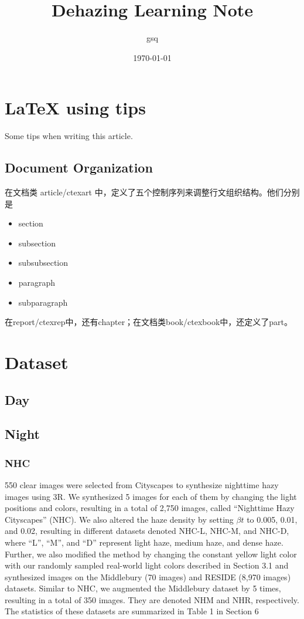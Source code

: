 \documentclass[UTF8]{ctexart}
\title{Dehazing Learning Note}
\author{gsq}
\date{\today}
\begin{document}
\maketitle
\tableofcontents

\section{LaTeX using tips}

Some tips when writing this article.

\subsection{Document Organization}
在文档类 article/ctexart 中，定义了五个控制序列来调整行文组织结构。他们分别是

\begin{itemize}
    \item section
    \item subsection
    \item subsubsection
    \item paragraph
    \item subparagraph
\end{itemize}

在report/ctexrep中，还有chapter；在文档类book/ctexbook中，还定义了part。


\section{Dataset}

\subsection{Day}



\subsection{Night}

\subsubsection{NHC~\cite{3r}}

550 clear images were selected from Cityscapes to synthesize nighttime hazy images using 3R.
We synthesized 5 images for each of them by changing the light positions and colors, 
resulting in a total of 2,750 images, called “Nighttime Hazy Cityscapes” (NHC).
We also altered the haze density by setting $\beta t$ to 0.005, 0.01, and 0.02,
resulting in different datasets denoted NHC-L, NHC-M, and NHC-D, 
where “L”, “M”, and “D” represent light haze, medium haze, and dense haze. 
Further, we also modified the method by changing the constant yellow light color with our 
randomly sampled real-world light colors described in Section 3.1 and synthesized images 
on the Middlebury (70 images) and RESIDE (8,970 images) datasets.
Similar to NHC, we augmented the Middlebury dataset by 5 times, resulting in a total
of 350 images.
They are denoted NHM and NHR, respectively.
The statistics of these datasets are summarized in Table 1 in Section 6
\end{document}

